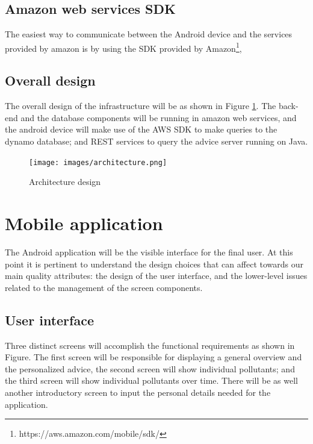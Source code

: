 \subsection{Amazon web services SDK}
The easiest way to communicate between the Android device and the services provided by amazon is by using the SDK provided by Amazon\footnote{https://aws.amazon.com/mobile/sdk/}, 

\subsection{Overall design}
The overall design of the infrastructure will be as shown in Figure \ref{fig:architecture}. The back-end and the database components will be running in amazon web services, and the android device will make use of the AWS SDK to make queries to the dynamo database; and REST services to query the advice server running on Java.

\begin{figure}[H]
\begin{adjustbox}{width=.8\textwidth,center=\textwidth}
  \centering
  \texttt{[image: images/architecture.png]}
\end{adjustbox}
  \caption[Architecture design]{Architecture design}
  \label{fig:architecture}
\end{figure}

\section{Mobile application}
The Android application will be the visible interface for the final user. At this point it is pertinent to understand the design choices that can affect towards our main quality attributes: the design of the user interface, and the lower-level issues related to the management of the screen components. 

\subsection{User interface}
Three distinct screens will accomplish the functional requirements as shown in Figure. The first screen will be responsible for displaying a general overview and the personalized advice, the second screen will show individual pollutants; and the third screen will show individual pollutants over time. There will be as well another introductory screen to input the personal details needed for the application.


